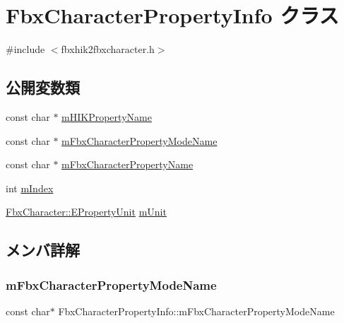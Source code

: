 \hypertarget{class_fbx_character_property_info}{}\section{Fbx\+Character\+Property\+Info クラス}
\label{class_fbx_character_property_info}


{\ttfamily \#include $<$fbxhik2fbxcharacter.\+h$>$}

\subsection*{公開変数類}
\begin{DoxyCompactItemize}
\item 
const char $\ast$ \hyperlink{class_fbx_character_property_info_a8d6a7c9e15c0944ddaff38b20d3c5bb8}{m\+H\+I\+K\+Property\+Name}
\item 
const char $\ast$ \hyperlink{class_fbx_character_property_info_aaebf44fac9acc7d36352077a50345761}{m\+Fbx\+Character\+Property\+Mode\+Name}
\item 
const char $\ast$ \hyperlink{class_fbx_character_property_info_a0f8c79a2e71440c4cbc4ce1ef5f6eef7}{m\+Fbx\+Character\+Property\+Name}
\item 
int \hyperlink{class_fbx_character_property_info_a62c37badd98e865a666616e877d2ff49}{m\+Index}
\item 
\hyperlink{class_fbx_character_aa48fb13a1c63e6a69ce9fa251993f8d5}{Fbx\+Character\+::\+E\+Property\+Unit} \hyperlink{class_fbx_character_property_info_ad22617f1c6c63b559f7da55af1519086}{m\+Unit}
\end{DoxyCompactItemize}


\subsection{メンバ詳解}
\mbox{\label{class_fbx_character_property_info_aaebf44fac9acc7d36352077a50345761}} 
\subsubsection{\texorpdfstring{m\+Fbx\+Character\+Property\+Mode\+Name}{mFbxCharacterPropertyModeName}}
{\footnotesize\ttfamily const char$\ast$ Fbx\+Character\+Property\+Info\+::m\+Fbx\+Character\+Property\+Mode\+Name}


